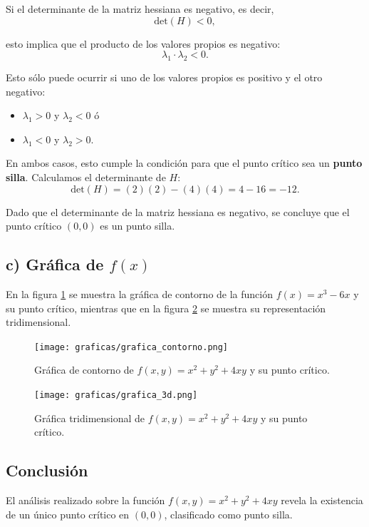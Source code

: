 \documentclass{article}
\begin{document}
Si el determinante de la matriz hessiana es negativo, es decir,
\[
\text{det}(H) < 0,
\]

esto implica que el producto de los valores propios es negativo:
\[
\lambda_1 \cdot \lambda_2 < 0.
\]

Esto sólo puede ocurrir si uno de los valores propios es positivo y el otro negativo:
\begin{itemize}
	\item \( \lambda_1 > 0 \) y \( \lambda_2 < 0 \) ó
	\item \( \lambda_1 < 0 \) y \( \lambda_2 > 0 \).
\end{itemize}

En ambos casos, esto cumple la condición para que el punto crítico sea un \textbf{punto silla}. Calculamos el determinante de \( H \):
\[
\text{det}(H) = (2)(2) - (4)(4) = 4 - 16 = -12.
\]

Dado que el determinante de la matriz hessiana es negativo, se concluye que el punto crítico \( (0, 0) \) es un punto silla.

\subsection*{c) Gráfica de $f(x)$}

En la figura \ref{fig:grafica_contorno} se muestra la gráfica de contorno de la función \( f(x) = x^3 - 6x \) y su punto crítico, mientras que en la figura \ref{fig:grafica_3d} se muestra su representación tridimensional.\cite{Elizondo2024}

\begin{figure}[h]
	\centering
	\texttt{[image: graficas/grafica\_contorno.png]}
	\caption{Gráfica de contorno de \( f(x, y) = x^2 + y^2 + 4xy \) y su punto crítico.}
	\label{fig:grafica_contorno}
\end{figure}

\begin{figure}[H]
	\centering
	\texttt{[image: graficas/grafica\_3d.png]}
	\caption{Gráfica tridimensional de \( f(x, y) = x^2 + y^2 + 4xy \) y su punto crítico.}
	\label{fig:grafica_3d}
\end{figure}

\subsection*{Conclusión}
El análisis realizado sobre la función \( f(x, y) = x^2 + y^2 + 4xy \) revela la existencia de un único punto crítico en \( (0, 0) \), clasificado como punto silla.
\end{document}
